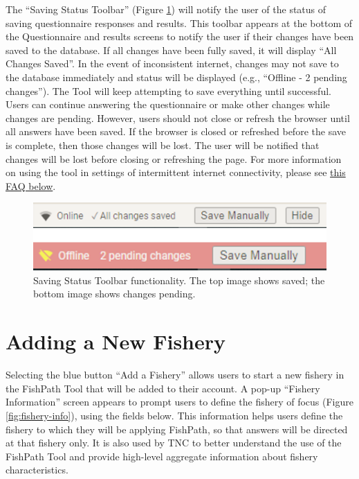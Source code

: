 \documentclass[
  11pt,
]{book}
\begin{document}
The ``Saving Status Toolbar'' (Figure \ref{fig:saving-status}) will notify the user of the status of saving questionnaire responses and results. This toolbar appears at the bottom of the Questionnaire and results screens to notify the user if their changes have been saved to the database. If all changes have been fully saved, it will display ``All Changes Saved''. In the event of inconsistent internet, changes may not save to the database immediately and status will be displayed (e.g., ``Offline - 2 pending changes''). The Tool will keep attempting to save everything until successful. Users can continue answering the questionnaire or make other changes while changes are pending. However, users should not close or refresh the browser until all answers have been saved. If the browser is closed or refreshed before the save is complete, then those changes will be lost. The user will be notified that changes will be lost before closing or refreshing the page. For more information on using the tool in settings of intermittent internet connectivity, please see \protect\hyperlink{faq-internet}{this FAQ below}.

\begin{figure}

{\centering \includegraphics[width=0.95\linewidth]{images/saving-status-toolbar} 

}

\caption{Saving Status Toolbar functionality. The top image shows saved; the bottom image shows changes pending.}\label{fig:saving-status}
\end{figure}

\hypertarget{adding-a-new-fishery}{%
\section{Adding a New Fishery}\label{adding-a-new-fishery}}

Selecting the blue button ``Add a Fishery'' allows users to start a new fishery in the FishPath Tool that will be added to their account. A pop-up ``Fishery Information'' screen appears to prompt users to define the fishery of focus (Figure \ref{fig:fishery-info}), using the fields below. This information helps users define the fishery to which they will be applying FishPath, so that answers will be directed at that fishery only. It is also used by TNC to better understand the use of the FishPath Tool and provide high-level aggregate information about fishery characteristics.
\end{document}
